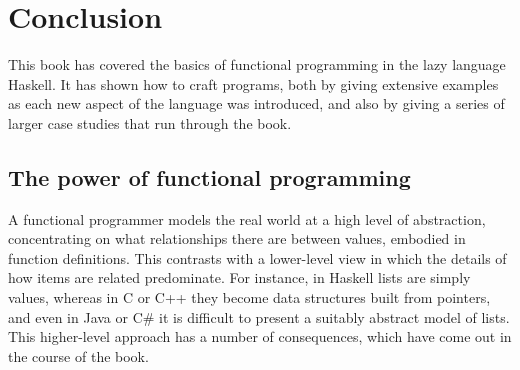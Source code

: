 
\chapter{Conclusion}
\chapstart
\label{conclusion}

This book has covered the basics of functional programming
in the lazy language Haskell. It has shown how to craft programs, both by giving 
extensive examples as each new aspect of the language was introduced, and also by giving 
a series of larger case studies that run through the book. 

\section*{The power of functional programming}
A functional programmer models the real world at a high level of
abstraction, concentrating on what relationships there are between
values, embodied in function definitions. This contrasts with a 
lower-level view  in which the details of how items are related predominate.
For instance, in Haskell lists are simply values, whereas in C or C++ they
become data structures built from pointers, and even in Java or C\# it is
difficult to present a suitably abstract model of lists.
This higher-level approach has a number of consequences, which have come out in the course
of the book.
